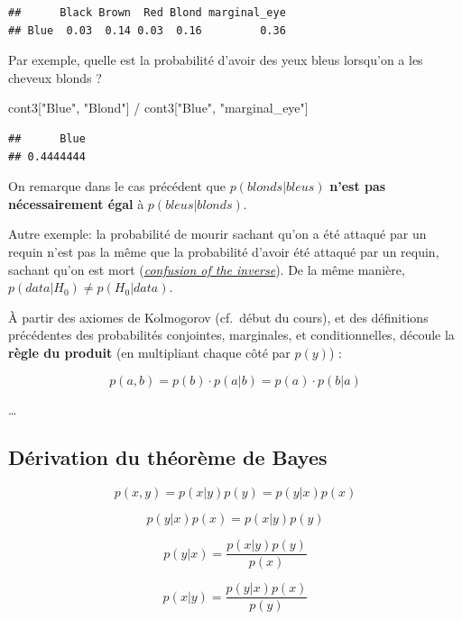 \documentclass[
  a4paper,11pt,twoside,onecolumn,openright,final,oldfontcommands]{memoir}
\newenvironment{Shaded}{\begin{snugshade}}{\end{snugshade}}
\newcommand{\NormalTok}[1]{#1}
\newcommand{\SpecialCharTok}[1]{\textcolor[rgb]{0.00,0.00,0.00}{#1}}
\newcommand{\StringTok}[1]{\textcolor[rgb]{0.31,0.60,0.02}{#1}}
\theoremstyle{definition}
\theoremstyle{definition}
\theoremstyle{definition}
\theoremstyle{definition}
\theoremstyle{remark}
\begin{document}
\begin{verbatim}
##      Black Brown  Red Blond marginal_eye
## Blue  0.03  0.14 0.03  0.16         0.36
\end{verbatim}

Par exemple, quelle est la probabilité d'avoir des yeux bleus lorsqu'on a les cheveux blonds ?

\begin{Shaded}
\begin{Highlighting}[]
\NormalTok{cont3[}\StringTok{"Blue"}\NormalTok{, }\StringTok{"Blond"}\NormalTok{] }\SpecialCharTok{/}\NormalTok{ cont3[}\StringTok{"Blue"}\NormalTok{, }\StringTok{"marginal\_eye"}\NormalTok{]  }
\end{Highlighting}
\end{Shaded}

\begin{verbatim}
##      Blue 
## 0.4444444
\end{verbatim}

On remarque dans le cas précédent que \(p(blonds|bleus)\) \textbf{n'est pas nécessairement égal} à \(p(bleus|blonds)\).

Autre exemple: la probabilité de mourir sachant qu'on a été attaqué par un requin n'est pas la même que la probabilité d'avoir été attaqué par un requin, sachant qu'on est mort (\href{https://en.wikipedia.org/wiki/Confusion_of_the_inverse}{\emph{confusion of the inverse}}). De la même manière, \(p(data|H_{0}) \neq p(H_{0}|data)\).

À partir des axiomes de Kolmogorov (cf.~début du cours), et des définitions précédentes des probabilités conjointes, marginales, et conditionnelles, découle la \textbf{règle du produit} (en multipliant chaque côté par \(p(y)\)) :

\[p(a, b) = p(b) \cdot p(a|b) = p(a) \cdot p(b|a)\]

\ldots{}

\hypertarget{duxe9rivation-du-thuxe9oruxe8me-de-bayes}{%
\subsection{Dérivation du théorème de Bayes}\label{duxe9rivation-du-thuxe9oruxe8me-de-bayes}}

\[p(x, y) = p(x|y) p(y) = p(y|x)p(x)\]

\[p(y|x)p(x) = p(x|y)p(y)\]

\[p(y|x) = \dfrac{p(x|y)p(y)}{p(x)}\]

\[p(x|y) = \dfrac{p(y|x)p(x)}{p(y)}\]
\end{document}
